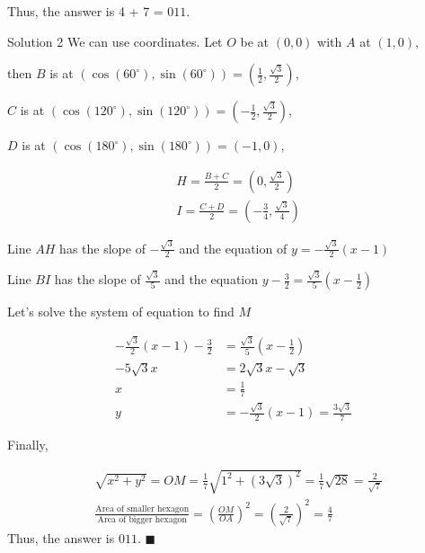 \documentclass[a4paper,11pt]{article}
\begin{document}
Thus, the answer is 4 + 7 = $\boxed{011}$.

Solution 2
We can use coordinates. Let $O$ be at $(0,0)$ with $A$ at $(1,0)$,

then $B$ is at $(\cos(60^\circ),\sin(60^\circ))=\left(\frac{1}{2},\frac{\sqrt{3}}{2}\right)$,

$C$ is at $(\cos(120^\circ),\sin(120^\circ))=\left(-\frac{1}{2},\frac{\sqrt{3}}{2}\right)$,

$D$ is at $(\cos(180^\circ),\sin(180^\circ))=(-1,0)$,

\begin{equation}
\begin{split}
&H=\frac{B+C}{2}=\left(0,\frac{\sqrt{3}}{2}\right) \\ &I=\frac{C+D}{2}=\left(-\frac{3}{4},\frac{\sqrt{3}}{4}\right)
\end{split}
\end{equation}

Line $AH$ has the slope of $-\frac{\sqrt{3}}{2}$ and the equation of $y=-\frac{\sqrt{3}}{2}(x-1)$


Line $BI$ has the slope of $\frac{\sqrt{3}}{5}$ and the equation $y-\frac{3}{2}=\frac{\sqrt{3}}{5}\left(x-\frac{1}{2}\right)$


Let's solve the system of equation to find $M$

\begin{equation}
\begin{split}
-\frac{\sqrt{3}}{2}(x-1)-\frac{3}{2}&=\frac{\sqrt{3}}{5}\left(x-\frac{1}{2}\right) \\ -5\sqrt{3}x&=2\sqrt{3}x-\sqrt{3} \\ x&=\frac{1}{7} \\ y&=-\frac{\sqrt{3}}{2}(x-1)=\frac{3\sqrt{3}}{7}
\end{split}
\end{equation}

Finally,

\begin{equation}
\begin{split}
&\sqrt{x^2+y^2}=OM=\frac{1}{7}\sqrt{1^2+(3\sqrt{3})^2}=\frac{1}{7}\sqrt{28}=\frac{2}{\sqrt{7}} \\ &\frac{\text{Area of smaller hexagon}}{\text{Area of bigger hexagon}}=\left(\frac{OM}{OA}\right)^2=\left(\frac{2}{\sqrt{7}}\right)^2=\frac{4}{7}
\end{split}
\end{equation}
Thus, the answer is $\boxed{011}$. \hfill $\blacksquare$
\end{document}
